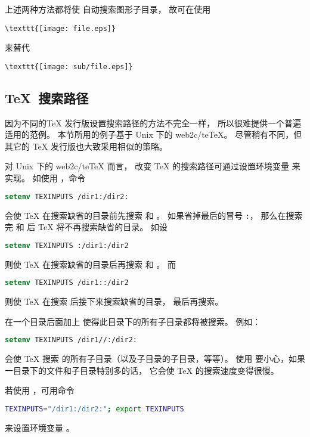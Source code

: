 上述两种方法都将使  自动搜索图形子目录，
故可在使用
\begin{lstlisting}
\texttt{[image: file.eps]}
\end{lstlisting}
来替代
\begin{lstlisting}
\texttt{[image: sub/file.eps]}
\end{lstlisting}

\subsection{\TeX{}~搜索路径}\label{ssec:texpath}

因为不同的\TeX{} 发行版设置搜索路径的方法不完全一样，
所以很难提供一个普遍适用的范例。
本节所用的例子基于 Unix 下的 web2c/te\TeX{}。
尽管稍有不同，但其它的 \TeX{} 发行版也大致采用相似的策略。

对 Unix 下的 web2c/te\TeX{} 而言，
改变 \TeX{} 的搜索路径可通过设置环境变量  来实现。
如使用 ，命令
\begin{lstlisting}[language=csh]
setenv TEXINPUTS /dir1:/dir2:
\end{lstlisting}
会使 \TeX{} 在搜索缺省的目录前先搜索  和 。
如果省掉最后的冒号 \texttt{:}，
那么在搜索完  和  后 \TeX{} 将不再搜索缺省的目录。
如设
\begin{lstlisting}[language=csh]
setenv TEXINPUTS :/dir1:/dir2
\end{lstlisting}
则使 \TeX{} 在搜索缺省的目录后再搜索  和 。
而
\begin{lstlisting}[language=csh]
setenv TEXINPUTS /dir1::/dir2
\end{lstlisting}
则使 \TeX{} 在搜索  后接下来搜索缺省的目录，
最后再搜索。

在一个目录后面加上 \file{//} 使得此目录下的所有子目录都将被搜索。
例如：
\begin{lstlisting}[language=csh]
setenv TEXINPUTS /dir1//:/dir2:
\end{lstlisting}
会使 \TeX{} 搜索  的所有子目录（以及子目录的子目录，等等）。
使用 \file{//} 要小心，如果一目录下的文件和子目录特别多的话，
它会使 \TeX{} 的搜索速度变得很慢。

若使用 ，可用命令
\begin{lstlisting}[language=sh]
TEXINPUTS="/dir1:/dir2:"; export TEXINPUTS
\end{lstlisting}
来设置环境变量 。

